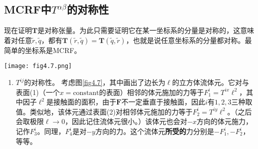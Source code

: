 \subsection*{MCRF中$T^{\alpha \beta}$的对称性}
现在证明$\mathbf{T}$是对称张量。为此只需要证明它在某一坐标系的分量是对称的，这意味着对任意$\tilde{r}, \tilde{q}$，都有$\mathbf{T} (\tilde{r}, \tilde{q}) = \mathbf{T} (\tilde{q}, \tilde{r})$，也就是说任意坐标系的分量都对称。最简单的坐标系是MCRF。

{
        \centering
        \texttt{[image: fig4.7.png]}
        \label{fig4.7}
}

\begin{enumerate}
    \item $T^{ij}$的对称性。 考虑图\ref{fig4.7}，其中画出了边长为$\ell$的立方体流体元。它对与表面(1)（一个$x = \text{constant}$的表面）相邻的体元施加的力等于$F^i_1 = T^{ix} \ell^2$，其中因子$\ell^2$是接触面的面积，由于$\bm{F}$不一定垂直于接触面，因此$i$有$1, 2, 3$三种取值。类似地，该体元通过表面(2)对相邻体元施加的力等于$F_2^i = T^{iy} \ell^2$。（之后会取极限$\ell \to 0$，因此记住流体元很小。）该体元也会对$-x$方向的体元施力，记作$F_3^i$。同理，$F_4^i$是对$-y$方向的力。这个流体元\textbf{所受的}力分别是$-F_1^i, -F_2^i$，等等。


\end{enumerate}

